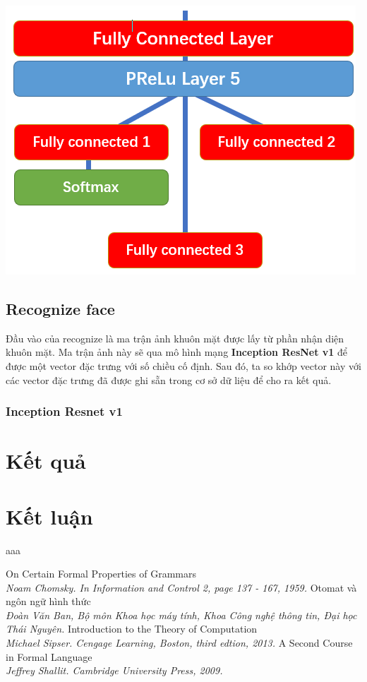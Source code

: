 \documentclass[12pt]{extreport}
\begin{document}
\begin{center}
\includegraphics[scale=0.5]{Image/MTCNN_O_net_last}
\end{center}

\section{Recognize face}
Đầu vào của recognize là ma trận ảnh khuôn mặt được lấy từ phần nhận diện khuôn mặt. Ma trận ảnh này sẽ qua mô hình mạng \textbf{Inception ResNet v1} để được một vector đặc trưng với số chiều cố định. Sau đó, ta so khớp vector này với các vector đặc trưng đã được ghi sẵn trong cơ sở dữ liệu để cho ra kết quả.

\subsection{Inception Resnet v1}



\chapter{Kết quả}
\newpage
\chapter{Kết luận}
aaa

\newpage
\begin{thebibliography}{12}
	On Certain Formal Properties of Grammars\\
	\textit{Noam Chomsky. In Information and Control 2, page 137 - 167, 1959.}
	 Otomat và ngôn ngữ hình thức\\
	\textit{Đoàn Văn Ban, Bộ môn Khoa học máy tính, Khoa Công nghệ thông tin, Đại học Thái Nguyên.}
	Introduction to the Theory of Computation\\
	\textit{Michael Sipser. Cengage Learning, Boston, third edtion, 2013.
	}
	A Second Course in Formal Language\\
	\textit{Jeffrey Shallit. Cambridge University Press, 2009.}
	
	
	
\end{thebibliography}
\end{document}
